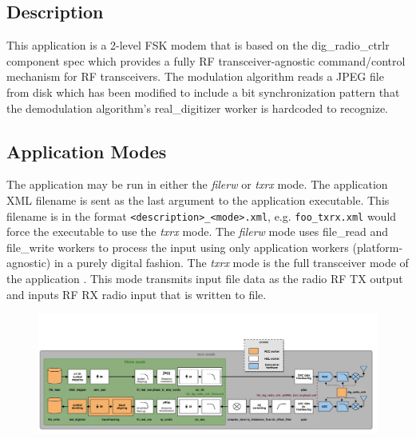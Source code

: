 \tableofcontents

\listoffigures

\begin{landscape}

  \section{Description}

    This application is a 2-level FSK modem that is based on the dig\_radio\_ctrlr
    component spec
    which provides a fully RF transceiver-agnostic command/control mechanism for RF
    transceivers.
    The modulation algorithm reads a JPEG file from disk which has been modified to
    include a bit synchronization pattern that the demodulation algorithm's
    real\_digitizer
    worker is hardcoded to
    recognize.

    \subsection{Application Modes}

      The application may be run in either the \textit{filerw} or \textit{txrx}
      mode.
      The application XML filename is sent as the last argument to the
      application executable. This filename is in the format
      \texttt{<description>\_<mode>.xml}, e.g. \texttt{foo\_txrx.xml} would force
      the executable to use the
      \textit{txrx} mode.
      The \textit{filerw} mode uses file\_read and file\_write workers to
      process the input using only application workers (platform-agnostic) in a
      purely digital fashion.
      The \textit{txrx} mode is the full transceiver mode of the application
      . This mode transmits input file data as the
      radio RF TX output and inputs RF RX radio input that is written to file.

      {\centering

      \begin{figure}[htpb]
        \centering
        \captionsetup{type=figure}\includegraphics[scale=0.35]{fsk_app_diagram_new}
        \label{fig:app_diagram_new}
      \end{figure}}


\end{landscape}
